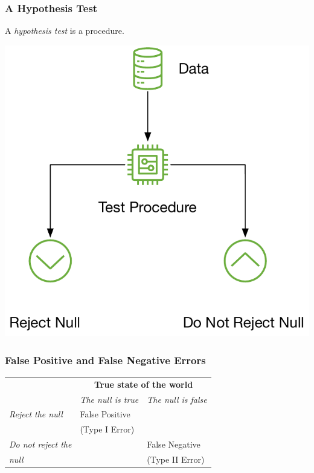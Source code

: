 \documentclass[12pt, block=fill]{beamer}
\begin{document}
\begin{frame}
\frametitle{A Hypothesis Test}

A \textit{hypothesis test} is a procedure.

\begin{center}
  \includegraphics[width=.65\textwidth]{figures/test_procedure}
\end{center}
\end{frame}


\begin{frame}
  \frametitle{False Positive and False Negative Errors}
  \begin{center}
    \small
    \begin{tabular}{p{3cm}| p{3cm}| p{3cm}}
      & \multicolumn{2}{c}{\textbf{True state of the world}}  \\ 
      & \textit{The null is true} & \textit{The null is false} \\
      \hline \hline 
      \textit{Reject the null} & False Positive & \\
      & (Type I Error) & \\
      \hline 
      \textit{Do not reject the } & & False Negative\\
      \textit{null}&& (Type II Error)
    \end{tabular}
  \end{center}
\end{frame}
\end{document}
